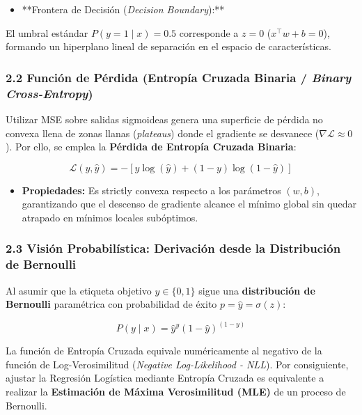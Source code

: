 \documentclass[11pt,oneside]{article}
\begin{document}
\begin{itemize}

\item **Frontera de Decisión (\emph{Decision Boundary}):**

\end{itemize}

  El umbral estándar \(P(y=1 \mid x) = 0.5\) corresponde a \(z = 0\) (\(x^\top w + b = 0\)), formando un hiperplano lineal de separación en el espacio de características.

\subsubsection{2.2 Función de Pérdida (Entropía Cruzada Binaria / \emph{Binary Cross-Entropy})}

Utilizar MSE sobre salidas sigmoideas genera una superficie de pérdida no convexa llena de zonas llanas (\emph{plateaus}) donde el gradiente se desvanece (\(\nabla \mathcal{L} \approx 0\)). Por ello, se emplea la \textbf{Pérdida de Entropía Cruzada Binaria}:

\[\mathcal{L}(y, \hat{y}) = - \left[ y \log(\hat{y}) + (1 - y) \log(1 - \hat{y}) \right]\]

\begin{itemize}

\item \textbf{Propiedades:} Es strictly convexa respecto a los parámetros \((w, b)\), garantizando que el descenso de gradiente alcance el mínimo global sin quedar atrapado en mínimos locales subóptimos.

\end{itemize}

\subsubsection{2.3 Visión Probabilística: Derivación desde la Distribución de Bernoulli}

Al asumir que la etiqueta objetivo \(y \in \{0, 1\}\) sigue una \textbf{distribución de Bernoulli} paramétrica con probabilidad de éxito \(p = \hat{y} = \sigma(z)\):

\[P(y \mid x) = \hat{y}^y (1 - \hat{y})^{(1-y)}\]

La función de Entropía Cruzada equivale numéricamente al negativo de la función de Log-Verosimilitud (\emph{Negative Log-Likelihood - NLL}). Por consiguiente, ajustar la Regresión Logística mediante Entropía Cruzada es equivalente a realizar la \textbf{Estimación de Máxima Verosimilitud (MLE)} de un proceso de Bernoulli.
\end{document}
